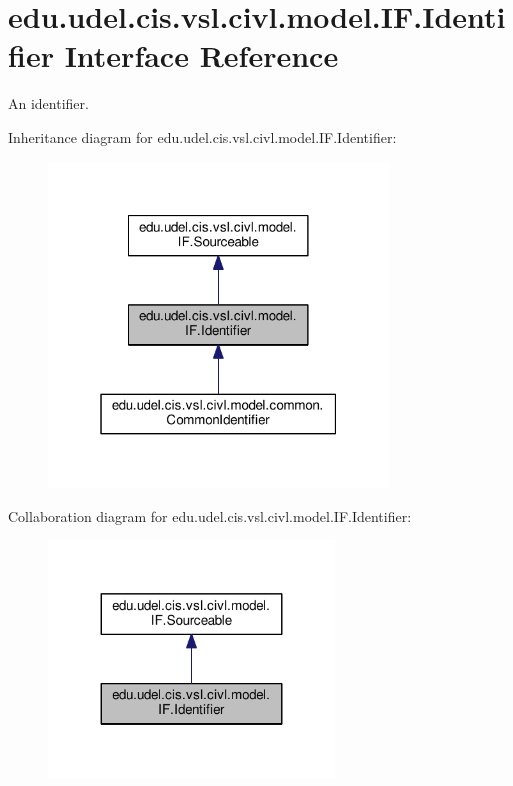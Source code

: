 \hypertarget{interfaceedu_1_1udel_1_1cis_1_1vsl_1_1civl_1_1model_1_1IF_1_1Identifier}{}\section{edu.\+udel.\+cis.\+vsl.\+civl.\+model.\+I\+F.\+Identifier Interface Reference}
\label{interfaceedu_1_1udel_1_1cis_1_1vsl_1_1civl_1_1model_1_1IF_1_1Identifier}


An identifier.  




Inheritance diagram for edu.\+udel.\+cis.\+vsl.\+civl.\+model.\+I\+F.\+Identifier\+:
\nopagebreak
\begin{figure}[H]
\begin{center}
\leavevmode
\includegraphics[width=256pt]{interfaceedu_1_1udel_1_1cis_1_1vsl_1_1civl_1_1model_1_1IF_1_1Identifier__inherit__graph}
\end{center}
\end{figure}


Collaboration diagram for edu.\+udel.\+cis.\+vsl.\+civl.\+model.\+I\+F.\+Identifier\+:
\nopagebreak
\begin{figure}[H]
\begin{center}
\leavevmode
\includegraphics[width=215pt]{interfaceedu_1_1udel_1_1cis_1_1vsl_1_1civl_1_1model_1_1IF_1_1Identifier__coll__graph}
\end{center}
\end{figure}

